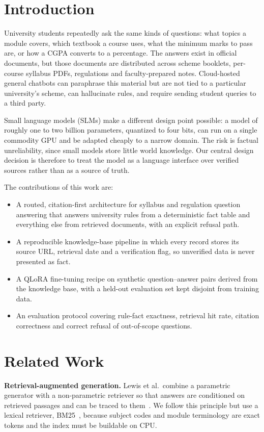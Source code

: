 \documentclass[conference]{IEEEtran}
\begin{document}
\section{Introduction}
University students repeatedly ask the same kinds of questions: what topics a module covers, which textbook a course uses, what the minimum marks to pass are, or how a CGPA converts to a percentage. The answers exist in official documents, but those documents are distributed across scheme booklets, per-course syllabus PDFs, regulations and faculty-prepared notes. Cloud-hosted general chatbots can paraphrase this material but are not tied to a particular university's scheme, can hallucinate rules, and require sending student queries to a third party.

Small language models (SLMs) make a different design point possible: a model of roughly one to two billion parameters, quantized to four bits, can run on a single commodity GPU and be adapted cheaply to a narrow domain. The risk is factual unreliability, since small models store little world knowledge. Our central design decision is therefore to treat the model as a language interface over verified sources rather than as a source of truth.

The contributions of this work are:
\begin{itemize}
\item A routed, citation-first architecture for syllabus and regulation question answering that answers university rules from a deterministic fact table and everything else from retrieved documents, with an explicit refusal path.
\item A reproducible knowledge-base pipeline in which every record stores its source URL, retrieval date and a verification flag, so unverified data is never presented as fact.
\item A QLoRA fine-tuning recipe on synthetic question--answer pairs derived from the knowledge base, with a held-out evaluation set kept disjoint from training data.
\item An evaluation protocol covering rule-fact exactness, retrieval hit rate, citation correctness and correct refusal of out-of-scope questions.
\end{itemize}

\section{Related Work}
\textbf{Retrieval-augmented generation.} Lewis et al.\ combine a parametric generator with a non-parametric retriever so that answers are conditioned on retrieved passages and can be traced to them~\cite{lewis2020rag}. We follow this principle but use a lexical retriever, BM25~\cite{robertson2009bm25}, because subject codes and module terminology are exact tokens and the index must be buildable on CPU.
\end{document}
